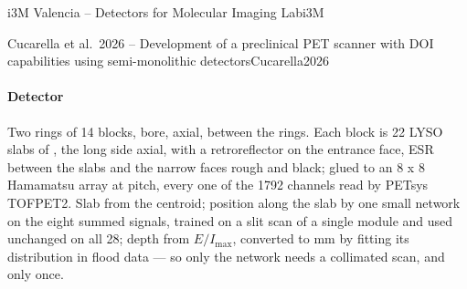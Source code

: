 \begin{programnote}{i3M Valencia -- Detectors for Molecular Imaging Lab}{i3M}
\begin{papernote}{Cucarella et al.\ 2026 -- Development of a preclinical PET scanner with DOI capabilities using semi-monolithic detectors}{Cucarella2026}
\paragraph{Detector}
Two rings of 14 blocks,  bore,  axial,  between the
rings. Each block is 22 LYSO slabs of , the
long side axial, with a retroreflector on the entrance face, ESR between the
slabs and the narrow faces rough and black; glued to an 8 x 8 Hamamatsu array
at  pitch, every one of the 1792 channels read by PETsys TOFPET2. Slab
from the centroid; position along the slab by one small network on the eight
summed signals, trained on a slit scan of a single module and used unchanged on
all 28; depth from $E/I_{\max}$, converted to mm by fitting its distribution in
flood data --- so only the network needs a collimated scan, and only once.


\end{papernote}
\end{programnote}

